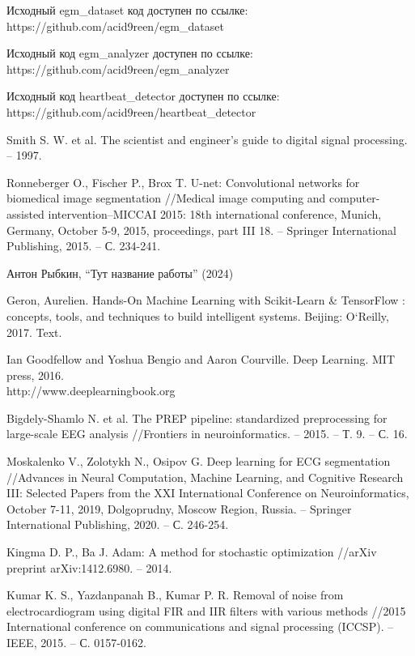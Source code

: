 \begingroup
\begin{thebibliography}{00}
	Исходный egm\_dataset код доступен по ссылке: https://github.com/acid9reen/egm\_dataset

	Исходный код egm\_analyzer доступен по ссылке: https://github.com/acid9reen/egm\_analyzer

	Исходный код heartbeat\_detector доступен по ссылке:\\
	https://github.com/acid9reen/heartbeat\_detector

	Smith S. W. et al. The scientist and engineer's guide to digital signal processing. -- 1997.

	Ronneberger O., Fischer P., Brox T. U-net: Convolutional networks for
	biomedical image segmentation //Medical image computing and
	computer-assisted intervention–MICCAI 2015: 18th international conference,
	Munich, Germany, October 5-9, 2015, proceedings, part III 18. – Springer
	International Publishing, 2015. – С. 234-241.

	Антон Рыбкин, ``Тут название работы'' (2024)

	Geron, Aurelien. Hands-On Machine Learning with Scikit-Learn \& TensorFlow
	: concepts, tools, and techniques to build intelligent systems. Beijing:
	O`Reilly, 2017. Text.

	Ian Goodfellow and Yoshua Bengio and Aaron Courville. Deep Learning. MIT
	press, 2016.\\ http://www.deeplearningbook.org

	Bigdely-Shamlo N. et al. The PREP pipeline: standardized preprocessing for
	large-scale EEG analysis //Frontiers in neuroinformatics. – 2015. – Т. 9. –
	С. 16.

	Moskalenko V., Zolotykh N., Osipov G. Deep learning for ECG segmentation
	//Advances in Neural Computation, Machine Learning, and Cognitive Research
	III: Selected Papers from the XXI International Conference on
	Neuroinformatics, October 7-11, 2019, Dolgoprudny, Moscow Region, Russia. –
	Springer International Publishing, 2020. – С. 246-254.

	Kingma D. P., Ba J. Adam: A method for stochastic optimization //arXiv
	preprint arXiv:1412.6980. – 2014.

	Kumar K. S., Yazdanpanah B., Kumar P. R. Removal of noise from
	electrocardiogram using digital FIR and IIR filters with various methods
	//2015 International conference on communications and signal processing
	(ICCSP). – IEEE, 2015. – С. 0157-0162.


\end{thebibliography}
